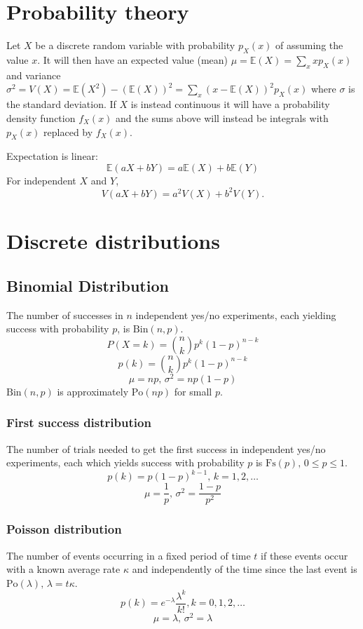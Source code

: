\section{Probability theory}
Let $X$ be a discrete random variable with probability $p_X(x)$ of assuming the value $x$. It will then have an expected value (mean) $\mu=\mathbb{E}(X)=\sum_xxp_X(x)$ and variance $\sigma^2=V(X)=\mathbb{E}(X^2)-(\mathbb{E}(X))^2=\sum_x(x-\mathbb{E}(X))^2p_X(x)$ where $\sigma$ is the standard deviation. If $X$ is instead continuous it will have a probability density function $f_X(x)$ and the sums above will instead be integrals with $p_X(x)$ replaced by $f_X(x)$.

Expectation is linear:
\[\mathbb{E}(aX+bY) = a\mathbb{E}(X)+b\mathbb{E}(Y)\]
For independent $X$ and $Y$, \[V(aX+bY) = a^2V(X)+b^2V(Y).\]

\section{Discrete distributions}

\subsection{Binomial Distribution}
\raggedright
The number of successes in $n$ independent yes/no experiments, each yielding success with probability $p$, is $\textrm{Bin}(n,p)$.
\[ P(X=k) = \binom{n}{k}p^k(1-p)^{n-k} \]
\[p(k)=\binom{n}{k}p^k(1-p)^{n-k}\]
\[\mu = np,\,\sigma^2=np(1-p)\]
$\textrm{Bin}(n,p)$ is approximately $\textrm{Po}(np)$ for small $p$.

\subsubsection{First success distribution}
The number of trials needed to get the first success in independent yes/no experiments, each which yields success with probability $p$ is $\textrm{Fs}(p),\,0\leq p\leq1$.
\[p(k)=p(1-p)^{k-1},\,k=1,2,\dots\]
\[\mu = \frac1p,\,\sigma^2=\frac{1-p}{p^2}\]

\subsubsection{Poisson distribution}
The number of events occurring in a fixed period of time $t$ if these events occur with a known average rate $\kappa$ and independently of the time since the last event is $\textrm{Po}(\lambda),\,\lambda=t\kappa$.
\[p(k)=e^{-\lambda}\frac{\lambda^k}{k!}, k=0,1,2,\dots\]
\[\mu=\lambda,\,\sigma^2=\lambda\]

